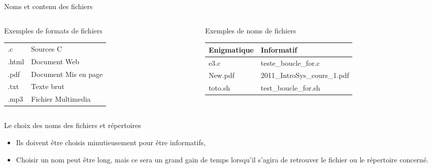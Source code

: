 \begin{frame}{Noms et contenu des fichiers}
\begin{columns}
\begin{column}{5.5cm}
\begin{block}{Exemples de formats de fichiers}
\begin{center}
\begin{tabular}{ll}
            \hline
            .c&Sources C\\
            .html&Document Web\\
            .pdf&Document Mis en page\\
            .txt&Texte brut\\
            .mp3&Fichier Multimedia\\
            \hline
          \end{tabular}
        \end{center}
      \end{block}
    \end{column}
    \begin{column}{5.5cm}
      \begin{block}{Exemples de noms de fichiers}
        \begin{center}
          \begin{tabular}{ll}
            \hline
            Enigmatique&Informatif\\
            \hline
            e3.c&teste\_boucle\_for.c\\
            New.pdf&2011\_IntroSys\_cours\_1.pdf\\
            toto.sh&test\_boucle\_for.sh\\
            \hline
          \end{tabular}
        \end{center}
      \end{block}
      \vrule
    \end{column}
  \end{columns}
  \begin{alertblock}{Le choix des noms des fichiers et répertoires}
    \begin{itemize}
    \item Ils doivent être choisis minutieusement pour être informatifs,
    \item Choisir un nom peut être long, mais ce sera un grand gain de temps lorsqu'il s'agira de retrouver le fichier ou le répertoire concerné.
    \end{itemize}
  \end{alertblock}
\end{frame}

